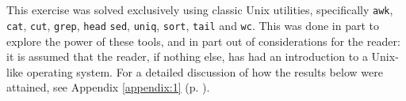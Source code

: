 
\section{}

This exercise was solved exclusively using classic Unix utilities\footnotemark,
specifically \texttt{awk}, \texttt{cat}, \texttt{cut}, \texttt{grep},
\texttt{head} \texttt{sed}, \texttt{uniq}, \texttt{sort}, \texttt{tail} and
\texttt{wc}.  This was done in part to explore the power of these tools, and in
part out of considerations for the reader: it is assumed that the reader, if
nothing else, has had an introduction to a Unix-like operating system. For a
detailed discussion of how the results below were attained, see Appendix
\ref{appendix:1} (p. \pageref{appendix:1}).


